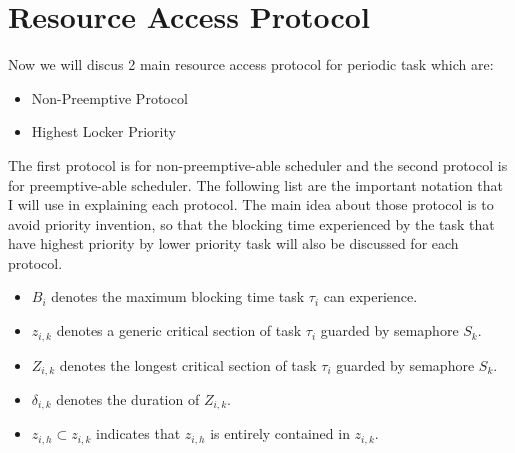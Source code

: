 \section{Resource Access Protocol}

Now we will discus 2 main resource access protocol for periodic task which are:

\begin{itemize}
\item Non-Preemptive Protocol
\item Highest Locker Priority

\end{itemize}


The first protocol is for non-preemptive-able scheduler and the second protocol is for preemptive-able scheduler. The following list are the important notation that I will use in explaining each protocol. The main idea about those protocol is to avoid priority invention, so that the blocking time experienced by the task that have highest priority by lower priority task will also be discussed for each protocol.

\begin{itemize}
\item $ B_{i} $ denotes the maximum blocking time task $ \tau_{i} $ can experience.
\item $ z_{i,k} $ denotes a generic critical section of task $ \tau_{i} $ guarded by semaphore $ S_{k} $.
\item  $ Z_{i,k} $ denotes the longest critical section of task $ \tau_{i} $ guarded by semaphore $ S_{k} $.
\item $ \delta_{i,k} $ denotes the duration of $ Z_{i,k} $.
\item $ z_{i,h} \subset z_{i,k} $ indicates that $ z_{i,h} $ is entirely contained in $ z_{i,k} $.



\end{itemize}



